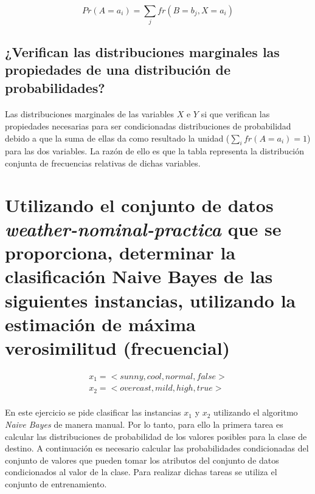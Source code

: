\documentclass{article}
\begin{document}
			\begin{equation}
			\label{eq:sum_probability}
				Pr(A = a_i) = \sum_{j}fr(B = b_j, X = a_i)
			\end{equation}

		\subsection{¿Verifican las distribuciones marginales las propiedades de una distribución de probabilidades?}

			\paragraph{}
			Las distribuciones marginales de las variables $X$ e $Y$ si que verifican las propiedades necesarias para ser condicionadas distribuciones de probabilidad debido a que la suma de ellas da como resultado la unidad ($\sum_{i}fr(A = a_i) = 1 $) para las dos variables. La razón de ello es que la tabla representa la distribución conjunta de frecuencias relativas de dichas variables.

	\section{Utilizando el conjunto de datos \emph{weather-nominal-practica} que se proporciona, determinar la clasificación Naive Bayes de las siguientes instancias, utilizando la estimación de máxima verosimilitud (frecuencial)}
	\label{sec:e3}

		\begin{align}
			x_1 = <sunny, cool, normal, false> \\
			x_2 = <overcast, mild, high, true>
		\end{align}

		\paragraph{}
		En este ejercicio se pide clasificar las instancias $x_1$ y $x_2$ utilizando el algoritmo \emph{Naive Bayes} de manera manual. Por lo tanto, para ello la primera tarea es calcular las distribuciones de probabilidad de los valores posibles para la clase de destino. A continuación es necesario calcular las probabilidades condicionadas del conjunto de valores que pueden tomar los atributos del conjunto de datos condicionados al valor de la clase. Para realizar dichas tareas se utiliza el conjunto de entrenamiento.
\end{document}
